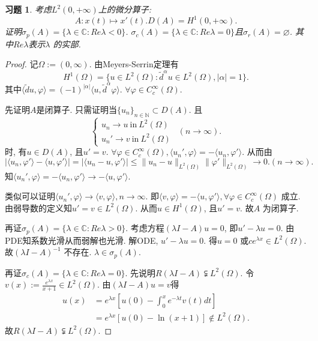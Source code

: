 \documentclass[UTF8,twoside]{ctexbook}
\newtheorem{exercise}{习题}[section]
\newcommand{\kx}{\mathbb}
\numberwithin{equation}{section}
\begin{document}
	\begin{exercise}
		考虑$L^2(0,+\infty)$上的微分算子:
		\[
		A:x(t)\mapsto x'(t).D(A)=H^1(0,+\infty).
		\]
		证明$\sigma_p(A)=\{\lambda\in\kx C:Re\lambda<0\}$. $\sigma_c(A)=\{\lambda\in\kx C:Re\lambda=0\}$且$\sigma_r(A)=\varnothing$. 其中$Re\lambda$表示$\lambda$ 的实部.
	\end{exercise}
	\begin{proof}
		记$\Omega:=(0,\infty)$. 由Meyers-Serrin定理有
		\[
		H^1(\Omega)=\{u\in L^2(\Omega):\widetilde{d}^\alpha u\in L^2(\Omega),|\alpha|=1\}.
		\]
		其中$\langle \widetilde{d}u,\varphi\rangle =(-1)^{|\alpha|}\langle u,\widetilde{d}^\alpha\varphi\rangle $. $\forall\varphi\in C_c^\infty(\Omega)$.

		先证明$A$是闭算子. 只需证明当$\{u_n\}_{n\in\kx N}\subset D(A)$. 且
		\[\left\{
		\begin{aligned}
		u_n\rightarrow u\ \text{in}\ L^2(\Omega)\\
		u_n'\rightarrow v\ \text{in}\ L^2(\Omega)
		\end{aligned} \right.\ \  (n\rightarrow\infty).
		\]
		时, 有$u\in D(A)$, 且$u'=v$. $\forall\varphi\in C_c^\infty(\Omega),\langle u_n',\varphi\rangle =-\langle u_n,\varphi'\rangle $. 从而由
		\[
		|\langle u_n,\varphi'\rangle -\langle u,\varphi'\rangle |=|\langle u_n-u,\varphi'\rangle |\leq\|u_n-u\|_{L^2(\Omega)}\|\varphi'\|_{L^2(\Omega)}\rightarrow0. (n\rightarrow\infty).
		\]
		知$\langle u_n',\varphi\rangle =-\langle u_n,\varphi'\rangle \rightarrow-\langle u,\varphi'\rangle $.

		类似可以证明$\langle u_n',\varphi\rangle\rightarrow\langle v,\varphi\rangle ,n\rightarrow\infty$. 即$\langle v,\varphi\rangle =-\langle u,\varphi'\rangle ,\forall\varphi\in C_c^\infty(\Omega)$ 成立. 由弱导数的定义知$u'=v\in L^2(\Omega)$. 从而$u\in H^1(\Omega)$, 且$u'=v$. 故$A$ 为闭算子.

		再证$\sigma_p(A)=\{\lambda\in\kx C:Re\lambda>0\}$. 考虑方程$(\lambda I-A)u=0$, 即$u'-\lambda u=0$. 由PDE知系数光滑从而弱解也光滑. 解ODE, $u'-\lambda u=0$. 得$u=0$ 或$ce^{\lambda x}\in L^2(\Omega)$. 故$(\lambda I-A)^{-1}$ 不存在. $\lambda\in\sigma_p(A)$.

		再证$\sigma_c(A)=\{\lambda\in\kx C:Re\lambda=0\}$. 先说明$R(\lambda I-A)\subsetneqq L^2(\Omega)$. 令$v(x):=\frac{e^{\lambda x}}{x+1}\in L^2(\Omega)$. 由$(\lambda I-A)u=v$得
		\[
		\begin{aligned}
		u(x)&=e^{\lambda x}[u(0)-\int_0^x e^{-\lambda t}v(t)dt]\\
		&=e^{\lambda x}[u(0)-\ln(x+1)]\notin L^2(\Omega).
		\end{aligned}
		\]
		故$R(\lambda I-A)\subsetneqq L^2(\Omega)$.


\end{proof}
\end{document}
